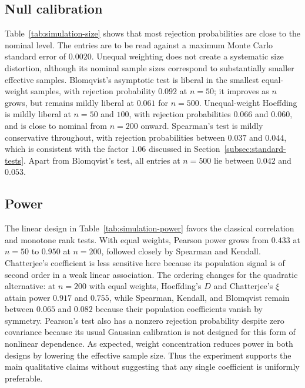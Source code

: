 \subsection{Null calibration}



Table~\ref{tab:simulation-size} shows that most rejection probabilities are
close to the nominal level.  The entries are to be read against a maximum
Monte Carlo standard error of $0.0020$.  Unequal weighting does not create a
systematic size distortion, although its nominal sample sizes correspond to
substantially smaller effective samples.  Blomqvist's asymptotic test is
liberal in the smallest equal-weight samples, with rejection probability
$0.092$ at $n=50$; it improves as $n$ grows, but remains mildly liberal at
$0.061$ for $n=500$.  Unequal-weight Hoeffding is mildly liberal at $n=50$ and
$100$, with rejection probabilities $0.066$ and $0.060$, and is close to
nominal from $n=200$ onward.  Spearman's test is mildly conservative
throughout, with rejection probabilities between $0.037$ and $0.044$, which is
consistent with the factor $1.06$ discussed in
Section~\ref{subsec:standard-tests}.  Apart from Blomqvist's test, all entries
at $n=500$ lie between $0.042$ and $0.053$.

\subsection{Power}



The linear design in Table~\ref{tab:simulation-power} favors the classical
correlation and monotone rank tests.  With equal weights, Pearson power grows
from $0.433$ at $n=50$ to $0.950$ at $n=200$, followed closely by Spearman and
Kendall.  Chatterjee's coefficient is less sensitive here because its
population signal is of second order in a weak linear association.  The
ordering changes for the quadratic alternative: at $n=200$ with equal weights,
Hoeffding's $D$ and Chatterjee's $\xi$ attain power $0.917$ and $0.755$, while
Spearman, Kendall, and Blomqvist remain between $0.065$ and $0.082$ because
their population coefficients vanish by symmetry.
Pearson's test also has a nonzero rejection probability despite zero
covariance because its usual Gaussian calibration is not designed for this
form of nonlinear dependence.  As expected, weight concentration reduces
power in both designs by lowering the effective sample size.  Thus the
experiment supports the main qualitative claims without suggesting that any
single coefficient is uniformly preferable.
